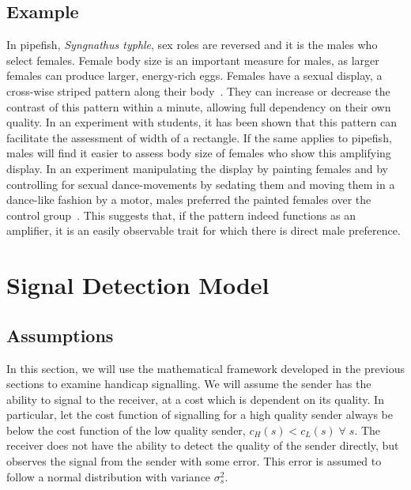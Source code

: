 \documentclass[a4paper,12pt]{article}
\numberwithin{equation}{section}
\begin{document}
\subsection{Example}
\label{sec:CueDetectionModelwithObservableAmplification/Example}

\enlargethispage{6mm}

In pipefish, \textit{Syngnathus typhle}, sex roles are reversed and it is the males who select females. Female body size is an important measure for males, as larger females can produce larger, energy-rich eggs. Females have a sexual display, a cross-wise striped pattern along their body~\cite{Berglund2000}. They can increase or decrease the contrast of this pattern within a minute, allowing full dependency on their own quality. In an experiment with students, it has been shown that this pattern can facilitate the assessment of width of a rectangle. If the same applies to pipefish, males will find it easier to assess body size of females who show this amplifying display. In an experiment manipulating the display by painting females and by controlling for sexual dance-movements by sedating them and moving them in a dance-like fashion by a motor, males preferred the painted females over the control group~\cite{Berglund2001}. This suggests that, if the pattern indeed functions as an amplifier, it is an easily observable trait for which there is direct male preference.


\newpage\clearpage


\section{Signal Detection Model}
\label{sec:Signal Detection Model}
\subsection{Assumptions}
\label{sec:SignalDetectionModel/Assumptions}

In this section, we will use the mathematical framework developed in the previous sections to examine handicap signalling. We will assume the sender has the ability to signal to the receiver, at a cost which is dependent on its quality. In particular, let the cost function of signalling for a high quality sender always be below the cost function of the low quality sender, $c_{H}(s)<c_{L}(s) \; \forall \; s$. The receiver does not have the ability to detect the quality of the sender directly, but observes the signal from the sender with some error. This error is assumed to follow a normal distribution with variance $\sigma^{2}_{s}$.
\end{document}
